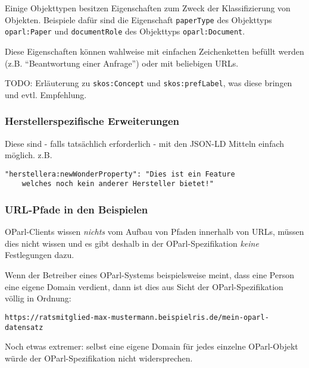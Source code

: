 \documentclass[,a4paper]{article}
\begin{document}

Einige Objekttypen besitzen Eigenschaften zum Zweck der Klassifizierung
von Objekten. Beispiele dafür sind die Eigenschaft \texttt{paperType}
des Objekttyps \texttt{oparl:Paper} und \texttt{documentRole} des
Objekttyps \texttt{oparl:Document}.

Diese Eigenschaften können wahlweise mit einfachen Zeichenketten befüllt
werden (z.B. ``Beantwortung einer Anfrage'') oder mit beliebigen URLs.

TODO: Erläuterung zu \texttt{skos:Concept} und \texttt{skos:prefLabel},
was diese bringen und evtl. Empfehlung.

\subsubsection{Herstellerspezifische
Erweiterungen}\label{herstellerspezifische-erweiterungen}

Diese sind - falls tatsächlich erforderlich - mit den JSON-LD Mitteln
einfach möglich. z.B.

\begin{verbatim}
"herstellera:newWonderProperty": "Dies ist ein Feature
    welches noch kein anderer Hersteller bietet!"
\end{verbatim}

\subsubsection{URL-Pfade in den
Beispielen}\label{url-pfade-in-den-beispielen}

OParl-Clients wissen \emph{nichts} vom Aufbau von Pfaden innerhalb von
URLs, müssen dies nicht wissen und es gibt deshalb in der
OParl-Spezifikation \emph{keine} Festlegungen dazu.

Wenn der Betreiber eines OParl-Systems beispielsweise meint, dass eine
Person eine eigene Domain verdient, dann ist dies aus Sicht der
OParl-Spezifikation völlig in Ordnung:

\begin{verbatim}
https://ratsmitglied-max-mustermann.beispielris.de/mein-oparl-datensatz
\end{verbatim}

Noch etwas extremer: selbst eine eigene Domain für jedes einzelne
OParl-Objekt würde der OParl-Spezifikation nicht widersprechen.
\end{document}
